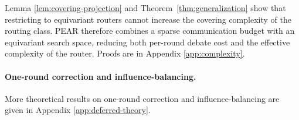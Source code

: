 Lemma \ref{lem:covering-projection} and Theorem~\ref{thm:generalization} show that restricting to equivariant routers cannot increase the covering complexity of the routing class. PEAR therefore combines a sparse communication budget with an equivariant search space, reducing both per-round debate cost and the effective complexity of the router. Proofs are in Appendix \ref{app:complexity}.

\paragraph{One-round correction and influence-balancing.} More theoretical results on one-round correction and influence-balancing are given in Appendix \ref{app:deferred-theory}.